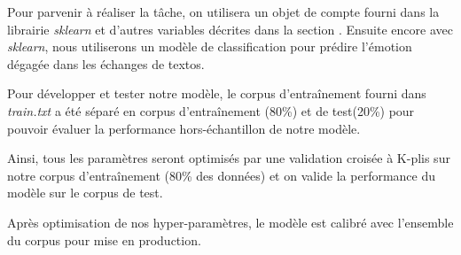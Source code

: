 Pour parvenir à réaliser la tâche, on utilisera un objet de compte fourni dans la librairie \emph{sklearn} et d'autres variables décrites dans la section . 
Ensuite encore avec \emph{sklearn}, nous utiliserons un modèle de classification pour prédire l'émotion dégagée dans les échanges de textos.

Pour développer et tester notre modèle, le corpus d'entraînement fourni dans \emph{train.txt} a été séparé en corpus d'entraînement (80\%) et de test(20\%)  pour pouvoir évaluer la performance hors-échantillon de notre modèle. 

Ainsi, tous les paramètres seront optimisés par une validation croisée à K-plis sur notre corpus d'entraînement (80\% des données) et on valide la performance du modèle sur le corpus de test.

Après optimisation de nos hyper-paramètres, le modèle est calibré avec l'ensemble du corpus pour mise en production.